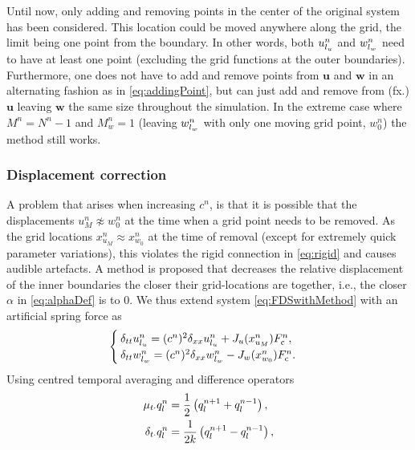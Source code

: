 Until now, only adding and removing points in the center of the original system has been considered. This location could be moved anywhere along the grid, the limit being one point from the boundary. In other words, both $u_{l_u}^n$ and $w_{l_w}^n$ need to have at least one point (excluding the grid functions at the outer boundaries). Furthermore, one does not have to add and remove points from $\mathbf{u}$ and $\mathbf{w}$ in an alternating fashion as in \eqref{eq:addingPoint}, but can just add and remove from (fx.) $\mathbf{u}$ leaving $\mathbf{w}$ the same size throughout the simulation. In the extreme case where $M^n = N^n - 1$ and $M_w^n = 1$ (leaving $w_{l_w}^n$ with only one moving grid point, $w_0^n$) the method still works.

\subsubsection{Displacement correction}\label{sec:dispCorr}
A problem that arises when increasing $c^n$, is that it is possible that the displacements $u_M^n \not\approx w_0^n$ at the time when a grid point needs to be removed. As the grid locations $x_{u_M}^n \approx x_{w_0}^n$ at the time of removal (except for extremely quick parameter variations), this violates the rigid connection in \eqref{eq:rigid} and causes audible artefacts. A method is proposed that decreases the relative displacement of the inner boundaries the closer their grid-locations are together, i.e., the closer $\alpha$ in \eqref{eq:alphaDef} is to 0. We thus extend system \eqref{eq:FDSwithMethod} with an artificial spring force as
\begin{equation}\label{eq:sysDispCorr}
\begin{cases}
    \delta_{tt}u_\lu^n = (c^n)^2\delta_{xx}u_\lu^n+ J_u(x_{u_M}^n)%
    F_\text{c}^n,\\
    \delta_{tt}w_\lw^n = (c^n)^2\delta_{xx}w_\lw^n - J_w(x_{w_0}^n)%
    F_\text{c}^n.
\end{cases}
\end{equation}
Using centred temporal averaging and difference operators
\begin{subequations}\label{eq:centredOperators}
\begin{align}\label{eq:centredAverage}
    \mu_{t\cdot}q_l^n &= \frac{1}{2} \left(q_l^{n+1} + q_l^{n-1}\right),\\
    \delta_{t\cdot}q_l^n &= \frac{1}{2k} \left(q_l^{n+1} - q_l^{n-1}\right),
\end{align}
\end{subequations}
